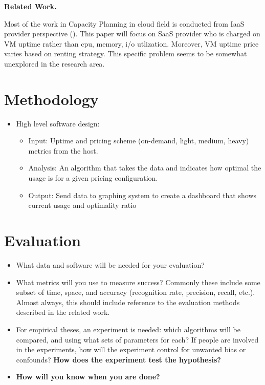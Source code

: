 \documentclass[11pt]{artikel3}
\begin{document}
{\bf Related Work.}

Most of the work in Capacity Planning in cloud field is conducted from IaaS provider perspective (). This paper will focus on SaaS provider who is charged on VM uptime rather than cpu, memory, i/o utlization. Moreover, VM uptime price varies based on renting strategy. This specific problem seems to be somewhat unexplored in the research area.

\section{Methodology}

\begin{itemize}
\item High level software design:
  \begin{itemize}
   \item Input: Uptime and pricing scheme (on-demand, light, medium, heavy) metrics from the host.
   \item Analysis: An algorithm that takes the data and indicates how optimal the usage is for a given pricing configuration.
   \item Output: Send data to graphing system to create a dashboard that shows current usage and optimality ratio
  \end{itemize}
\end{itemize}

\section{Evaluation}

\begin{itemize}
  \item What data and software will be needed for your evaluation? 
  \item What metrics
will you use to measure success? Commonly these include some subset of time, space, and accuracy (recognition rate, precision, recall, etc.).
Almost always, this should include reference to the evaluation methods described in the related work.
  \item For empirical theses, an experiment is needed: which algorithms will be compared, and using what sets of parameters for each? If people are involved in the experiments, how will the experiment control for unwanted bias or confounds? {\bf How does the experiment test the hypothesis?}
  \item {\bf How will you know when you are done?}
\end{itemize}
\end{document}
